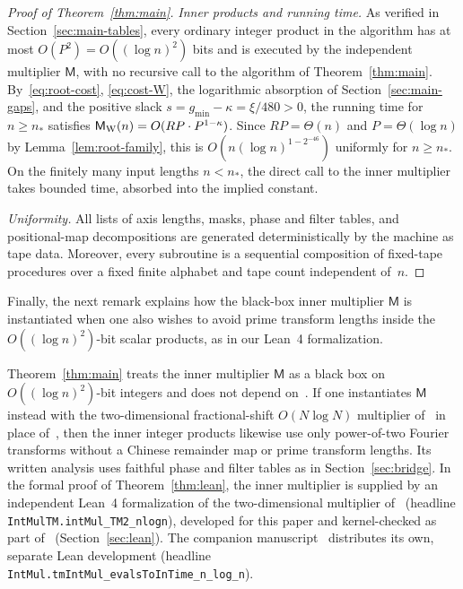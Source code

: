 \begin{proof}[Proof of Theorem~\ref{thm:main}]
\emph{Inner products and running time.} As verified in Section~\ref{sec:main-tables}, every ordinary integer product in
the algorithm has at most $O(P^2)=O((\log n)^2)$ bits and is executed by the independent multiplier $\mathsf M$, with no
recursive call to the algorithm of Theorem~\ref{thm:main}. By~\eqref{eq:root-cost}, \eqref{eq:cost-W}, the logarithmic
absorption of Section~\ref{sec:main-gaps}, and the positive slack $s=g_{\min}-\kappa=\xi/480>0$, the running time for
$n\ge n_*$ satisfies $\mathsf M_{\rm W}(n)=O(RP\cdot P^{1-\kappa})$. Since $RP=\Theta(n)$ and $P=\Theta(\log n)$ by
Lemma~\ref{lem:root-family}, this is $O(n(\log n)^{1-2^{-46}})$ uniformly for $n\ge n_*$. On the finitely many input
lengths $n<n_*$, the direct call to the inner multiplier takes bounded time, absorbed into the implied constant.

\emph{Uniformity.} All lists of axis lengths, masks, phase and filter tables, and positional-map decompositions are
generated deterministically by the machine as tape data. Moreover, every subroutine is a sequential composition of
fixed-tape procedures over a fixed finite alphabet and tape count independent of~$n$.
\end{proof}

Finally, the next remark explains how the black-box inner multiplier $\mathsf M$ is instantiated when one also wishes to
avoid prime transform lengths inside the $O((\log n)^2)$-bit scalar products, as in our Lean~4 formalization.

\begin{remark}\label{rem:crt-free}\label{cor:crt-free}
Theorem~\ref{thm:main} treats the inner multiplier $\mathsf M$ as a black box on $O((\log n)^2)$-bit integers and does
not depend on~\cite{MS}. If one instantiates $\mathsf M$ instead with the two-dimensional fractional-shift $O(N\log N)$
multiplier of~\cite{MS} in place of~\cite{SS71}, then the inner integer products likewise use only power-of-two Fourier
transforms without a Chinese remainder map or prime transform lengths. Its written
analysis uses faithful phase and filter tables as in Section~\ref{sec:bridge}. In the formal proof of Theorem~\ref{thm:lean},
the inner multiplier is supplied by an independent Lean~4 formalization of the two-dimensional multiplier of~\cite{MS}
(headline \texttt{IntMulTM.\allowbreak intMul\_\allowbreak TM2\_\allowbreak nlogn}), developed for this paper and
kernel-checked as part of~\cite{Lean26} (Section~\ref{sec:lean}). The companion manuscript~\cite{MS} distributes its
own, separate Lean development (headline \texttt{IntMul.\allowbreak tmIntMul\_\allowbreak evalsToInTime\_\allowbreak n\_\allowbreak log\_\allowbreak n}).
\end{remark}
